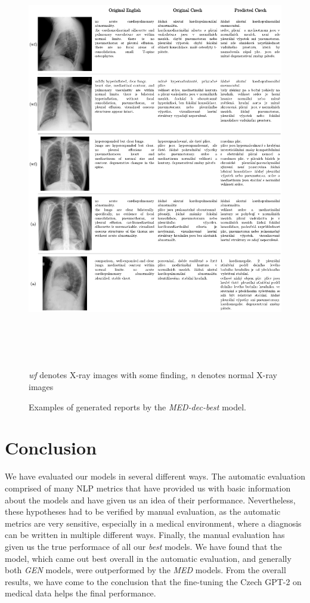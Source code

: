 \begin{figure}[h]\centering
\includegraphics[width=145mm, height=177.5mm]{../img/Examples2}
\caption{Examples of generated reports by the \textit{MED-dec-best} model.}
\label{fig02:Examples2}
\textit{wf} denotes X-ray images with some finding, \textit{n} denotes normal X-ray images
\end{figure}

\section{Conclusion}
We have evaluated our models in several different ways. The automatic evaluation comprised of many NLP metrics that have provided us with basic information about the models and have given us an idea of their performance. Nevertheless, these hypotheses had to be verified by manual evaluation, as the automatic metrics are very sensitive, especially in a medical environment, where a diagnosis can be written in multiple different ways. Finally, the manual evaluation has given us the true performace of all our \textit{best} models. We have found that the model, which came out best overall in the automatic evaluation, and generally both \textit{GEN} models, were outperformed by the \textit{MED} models. From the overall results, we have come to the conclusion that the fine-tuning the Czech GPT-2 on medical data helps the final performance.





